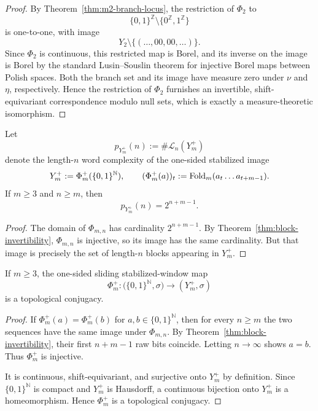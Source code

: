 \begin{proof}
By Theorem~\ref{thm:m2-branch-locus}, the restriction of $\Phi_2$ to
\[
\{0,1\}^{\mathbb Z}\setminus\{0^{\mathbb Z},1^{\mathbb Z}\}
\]
is one-to-one, with image
\[
Y_2\setminus\{(\ldots,00,00,\ldots)\}.
\]
Since $\Phi_2$ is continuous, this restricted map is Borel, and its inverse on the image is Borel by the standard Lusin--Souslin theorem for injective Borel maps between Polish spaces. Both the branch set and its image have measure zero under $\nu$ and $\eta$, respectively. Hence the restriction of $\Phi_2$ furnishes an invertible, shift-equivariant correspondence modulo null sets, which is exactly a measure-theoretic isomorphism.
\end{proof}

\begin{corollary}\label{cor:one-sided-complexity}
Let
\[
p_{Y_m^+}(n):=\#\mathcal L_n(Y_m^+)
\]
denote the length-$n$ word complexity of the one-sided stabilized image
\[
Y_m^+:=\Phi_m^+(\{0,1\}^{\mathbb N}),
\qquad
(\Phi_m^+(a))_t:=\mathrm{Fold}_m(a_t\ldots a_{t+m-1}).
\]
If $m\ge 3$ and $n\ge m$, then
\[
p_{Y_m^+}(n)=2^{n+m-1}.
\]
\end{corollary}

\begin{proof}
The domain of $\Phi_{m,n}$ has cardinality $2^{n+m-1}$. By Theorem~\ref{thm:block-invertibility}, $\Phi_{m,n}$ is injective, so its image has the same cardinality. But that image is precisely the set of length-$n$ blocks appearing in $Y_m^+$.
\end{proof}

\begin{corollary}\label{cor:one-sided-conjugacy}
If $m\ge 3$, the one-sided sliding stabilized-window map
\[
\Phi_m^+:\bigl(\{0,1\}^{\mathbb N},\sigma\bigr)\longrightarrow (Y_m^+,\sigma)
\]
is a topological conjugacy.
\end{corollary}

\begin{proof}
If $\Phi_m^+(a)=\Phi_m^+(b)$ for $a,b\in\{0,1\}^{\mathbb N}$, then for every $n\ge m$ the two sequences have the same image under $\Phi_{m,n}$. By Theorem~\ref{thm:block-invertibility}, their first $n+m-1$ raw bits coincide. Letting $n\to\infty$ shows $a=b$. Thus $\Phi_m^+$ is injective.

It is continuous, shift-equivariant, and surjective onto $Y_m^+$ by definition. Since $\{0,1\}^{\mathbb N}$ is compact and $Y_m^+$ is Hausdorff, a continuous bijection onto $Y_m^+$ is a homeomorphism. Hence $\Phi_m^+$ is a topological conjugacy.
\end{proof}

